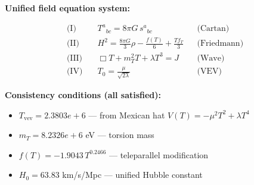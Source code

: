 
\textbf{Unified field equation system:}

\begin{align}
  \text{(I)} \quad & T^a{}_{bc} = 8\pi G \, s^a{}_{bc} && \text{(Cartan)} \\
  \text{(II)} \quad & H^2 = \frac{8\pi G}{3}\rho - \frac{f(T)}{6} + \frac{Tf_T}{3} && \text{(Friedmann)} \\
  \text{(III)} \quad & \Box T + m_T^2 T + \lambda T^3 = J && \text{(Wave)} \\
  \text{(IV)} \quad & T_0 = \frac{\mu}{\sqrt{2\lambda}} && \text{(VEV)}
\end{align}

\textbf{Consistency conditions (all satisfied):}
\begin{itemize}
  \item $T_{\text{vev}} = 2.3803e+6$ — from Mexican hat $V(T) = -\mu^2 T^2 + \lambda T^4$
  \item $m_T = 8.2326e+6$ eV — torsion mass
  \item $f(T) = -1.9043 \, T^{0.2466}$ — teleparallel modification
  \item $H_0 = 63.83$ km/s/Mpc — unified Hubble constant
\end{itemize}